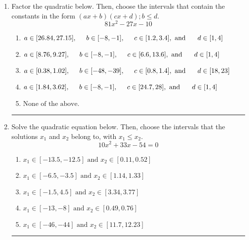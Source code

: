 \documentclass[14pt]{extbook}
\newcommand{\litem}[1]{\item#1\hspace*{-1cm}\rule{\textwidth}{0.4pt}}
\begin{document}
\begin{enumerate}
{\begin{enumerate}[label=\Alph*.]
\end{enumerate} }
\litem{
Factor the quadratic below. Then, choose the intervals that contain the constants in the form $(ax+b)(cx+d); b \leq d.$\[ 81x^{2} -27 x -10 \]\begin{enumerate}[label=\Alph*.]
\item \( a \in [26.84, 27.15], \hspace*{5mm} b \in [-8, -1], \hspace*{5mm} c \in [1.2, 3.4], \text{ and } \hspace*{5mm} d \in [1, 4] \)
\item \( a \in [8.76, 9.27], \hspace*{5mm} b \in [-8, -1], \hspace*{5mm} c \in [6.6, 13.6], \text{ and } \hspace*{5mm} d \in [1, 4] \)
\item \( a \in [0.38, 1.02], \hspace*{5mm} b \in [-48, -39], \hspace*{5mm} c \in [0.8, 1.4], \text{ and } \hspace*{5mm} d \in [18, 23] \)
\item \( a \in [1.84, 3.62], \hspace*{5mm} b \in [-8, -1], \hspace*{5mm} c \in [24.7, 28], \text{ and } \hspace*{5mm} d \in [1, 4] \)
\item \( \text{None of the above.} \)

\end{enumerate} }
\litem{
Solve the quadratic equation below. Then, choose the intervals that the solutions $x_1$ and $x_2$ belong to, with $x_1 \leq x_2$.\[ 10x^{2} +33 x -54 = 0 \]\begin{enumerate}[label=\Alph*.]
\item \( x_1 \in [-13.5, -12.5] \text{ and } x_2 \in [0.11, 0.52] \)
\item \( x_1 \in [-6.5, -3.5] \text{ and } x_2 \in [1.14, 1.33] \)
\item \( x_1 \in [-1.5, 4.5] \text{ and } x_2 \in [3.34, 3.77] \)
\item \( x_1 \in [-13, -8] \text{ and } x_2 \in [0.49, 0.76] \)
\item \( x_1 \in [-46, -44] \text{ and } x_2 \in [11.7, 12.23] \)


\end{enumerate}}
\end{enumerate}
\end{document}
